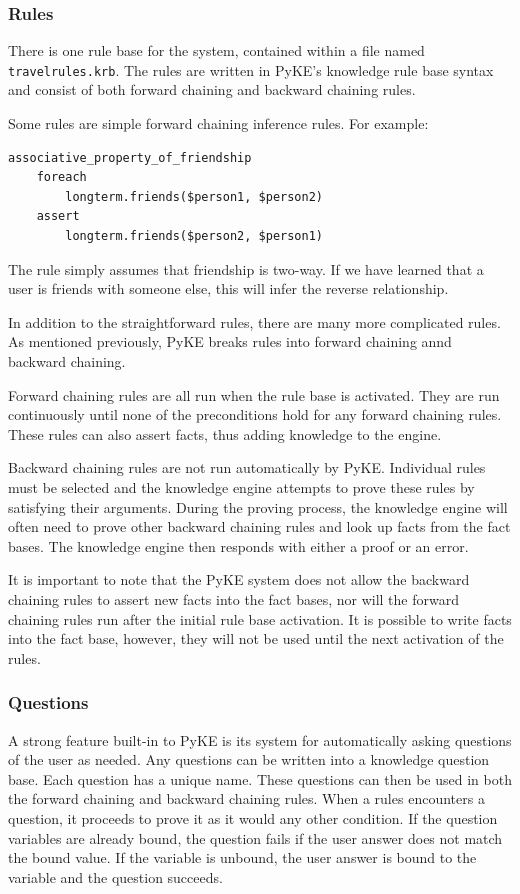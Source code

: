 \documentclass[11pt]{article} %
\begin{document}
\subsubsection{Rules}

There is one rule base for the system, contained within a file named \texttt{travelrules.krb}. The rules are written in PyKE's knowledge rule base syntax and consist of both forward chaining and backward chaining rules.

Some rules are simple forward chaining inference rules.
For example:
\begin{Verbatim}[xleftmargin=2.5cm]
associative_property_of_friendship
    foreach
        longterm.friends($person1, $person2)
    assert
        longterm.friends($person2, $person1)
\end{Verbatim}

The rule simply assumes that friendship is two-way. If we have learned that a user is friends with someone else, this will infer the reverse relationship.

In addition to the straightforward rules, there are many more complicated rules. As mentioned previously, PyKE breaks rules into forward chaining annd backward chaining.

Forward chaining rules are all run when the rule base is activated. They are run continuously until none of the preconditions hold for any forward chaining rules. These rules can also assert facts, thus adding knowledge to the engine.

Backward chaining rules are not run automatically by PyKE. Individual rules must be selected and the knowledge engine attempts to prove these rules by satisfying their arguments. During the proving process, the knowledge engine will often need to prove other backward chaining rules and look up facts from the fact bases. The knowledge engine then responds with either a proof or an error.

It is important to note that the PyKE system does not allow the backward chaining rules to assert new facts into the fact bases, nor will the forward chaining rules run after the initial rule base activation. It is possible to write facts into the fact base, however, they will not be used until the next activation of the rules.

\subsubsection{Questions}
A strong feature built-in to PyKE is its system for automatically asking questions of the user as needed. Any questions can be written into a knowledge question base. Each question has a unique name. These questions can then be used in both the forward chaining and backward chaining rules. When a rules encounters a question, it proceeds to prove it as it would any other condition. If the question variables are already bound, the question fails if the user answer does not match the bound value. If the variable is unbound, the user answer is bound to the variable and the question succeeds.
\end{document}
